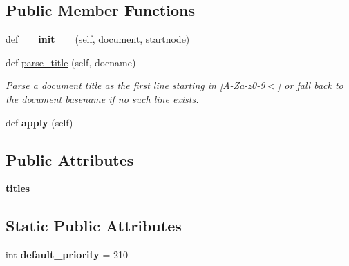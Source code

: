 \subsection*{Public Member Functions}
\begin{DoxyCompactItemize}
\item 
def {\bfseries \+\_\+\+\_\+init\+\_\+\+\_\+} (self, document, startnode)\hypertarget{classcmake_1_1CMakeTransform_ac0c3ca6417777d94072b73cc31fceb5a}{}\label{classcmake_1_1CMakeTransform_ac0c3ca6417777d94072b73cc31fceb5a}

\item 
def \hyperlink{classcmake_1_1CMakeTransform_aef2cd6c122395c8dd8c8a9a43c89be80}{parse\+\_\+title} (self, docname)
\begin{DoxyCompactList}\small\item\em Parse a document title as the first line starting in \mbox{[}A-\/\+Za-\/z0-\/9$<$\mbox{]} or fall back to the document basename if no such line exists. \end{DoxyCompactList}\item 
def {\bfseries apply} (self)\hypertarget{classcmake_1_1CMakeTransform_ae75d969103bcd104f698ffe8bd764f9a}{}\label{classcmake_1_1CMakeTransform_ae75d969103bcd104f698ffe8bd764f9a}

\end{DoxyCompactItemize}
\subsection*{Public Attributes}
\begin{DoxyCompactItemize}
\item 
{\bfseries titles}\hypertarget{classcmake_1_1CMakeTransform_a56d0ad5b508226202714d62125477210}{}\label{classcmake_1_1CMakeTransform_a56d0ad5b508226202714d62125477210}

\end{DoxyCompactItemize}
\subsection*{Static Public Attributes}
\begin{DoxyCompactItemize}
\item 
int {\bfseries default\+\_\+priority} = 210\hypertarget{classcmake_1_1CMakeTransform_ab5ae6cbdeb04d51d6bacbc516a27df80}{}\label{classcmake_1_1CMakeTransform_ab5ae6cbdeb04d51d6bacbc516a27df80}

\end{DoxyCompactItemize}



